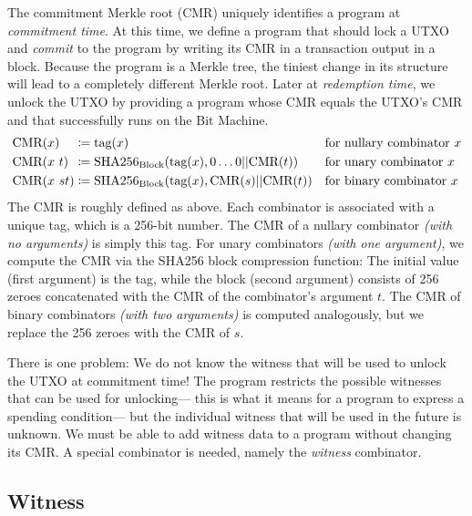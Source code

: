 The commitment Merkle root (CMR) uniquely identifies a program at \emph{commitment time}.
At this time,
we define a program that should lock a UTXO and \emph{commit} to the program by writing its CMR in a transaction output in a block.
Because the program is a Merkle tree,
the tiniest change in its structure will lead to a completely different Merkle root.
Later at \emph{redemption time},
we unlock the UTXO by providing a program whose CMR equals the UTXO's CMR and that successfully runs on the Bit Machine.
%
\begin{align*}
    \text{CMR}(x) \phantom{\ st} &\coloneqq \text{tag}(x) && \text{for nullary combinator $x$} \\
    \text{CMR}(x\ t) \phantom{s} &\coloneqq \text{SHA256}_\text{Block}(\text{tag}(x), 0\ldots 0 || \text{CMR}(t)) && \text{for unary combinator $x$} \\
    \text{CMR}(x\ st) &\coloneqq \text{SHA256}_\text{Block}(\text{tag}(x), \text{CMR}(s) || \text{CMR}(t)) && \text{for binary combinator $x$}
\end{align*}
%
The CMR is roughly defined as above.
Each combinator is associated with a unique tag, which is a 256-bit number.
The CMR of a nullary combinator \emph{(with no arguments)} is simply this tag.
For unary combinators \emph{(with one argument)},
we compute the CMR via the SHA256 block compression function:
The initial value (first argument) is the tag,
while the block (second argument) consists of 256 zeroes concatenated with the CMR of the combinator's argument $t$.
The CMR of binary combinators \emph{(with two arguments)} is computed analogously,
but we replace the 256 zeroes with the CMR of $s$.

There is one problem:
We do not know the witness that will be used to unlock the UTXO at commitment time!
The program restricts the possible witnesses that can be used for unlocking---%
this is what it means for a program to express a spending condition---%
but the individual witness that will be used in the future is unknown.
We must be able to add witness data to a program without changing its CMR.
A special combinator is needed, namely the \emph{witness} combinator.

\subsection{Witness}%
\label{ssec:witness}

